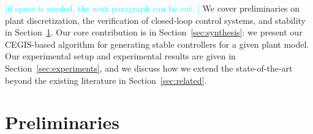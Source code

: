 \documentclass[final]{sig-alternate-05-2015}
\newcommand{\blue}[1]{{\color{blue}#1}}
\begin{document}

\textcolor{cyan}{[if space is needed, the next paragraph can be cut. ]}
We cover preliminaries on plant discretization, the verification of
closed-loop control systems, and stability in
Section~\ref{sec:preliminaries}.  Our core contribution is in
Section~\ref{sec:synthesis}: we present our CEGIS-based algorithm for
generating stable controllers for a given plant model.  Our experimental
setup and experimental results are given in Section~\ref{sec:experiments},
and we discuss how we extend the state-of-the-art beyond the existing
literature in Section~\ref{sec:related}.

\section{Preliminaries}\label{sec:preliminaries}

\end{document}
